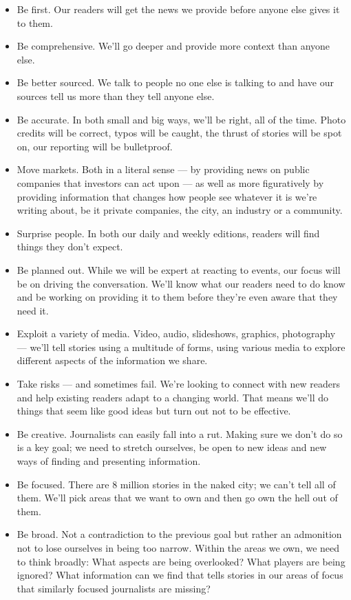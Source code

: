 \documentclass[
  11pt,
  american,
  letterpaperpaper,
  extrafontsizes,onecolumn,openright
  ]{memoir}
\providecommand{\tightlist}{%
  \setlength{\itemsep}{0pt}\setlength{\parskip}{0pt}}
\begin{document}
\begin{itemize}
\tightlist
\item
  Be first. Our readers will get the news we provide before anyone else gives it to them.
\item
  Be comprehensive. We'll go deeper and provide more context than anyone else.
\item
  Be better sourced. We talk to people no one else is talking to and have our sources tell us more than they tell anyone else.
\item
  Be accurate. In both small and big ways, we'll be right, all of the time. Photo credits will be correct, typos will be caught, the thrust of stories will be spot on, our reporting will be bulletproof.
\item
  Move markets. Both in a literal sense --- by providing news on public companies that investors can act upon --- as well as more figuratively by providing information that changes how people see whatever it is we're writing about, be it private companies, the city, an industry or a community.
\item
  Surprise people. In both our daily and weekly editions, readers will find things they don't expect.
\item
  Be planned out. While we will be expert at reacting to events, our focus will be on driving the conversation. We'll know what our readers need to do know and be working on providing it to them before they're even aware that they need it.
\item
  Exploit a variety of media. Video, audio, slideshows, graphics, photography --- we'll tell stories using a multitude of forms, using various media to explore different aspects of the information we share.
\item
  Take risks --- and sometimes fail. We're looking to connect with new readers and help existing readers adapt to a changing world. That means we'll do things that seem like good ideas but turn out not to be effective.
\item
  Be creative. Journalists can easily fall into a rut. Making sure we don't do so is a key goal; we need to stretch ourselves, be open to new ideas and new ways of finding and presenting information.
\item
  Be focused. There are 8 million stories in the naked city; we can't tell all of them. We'll pick areas that we want to own and then go own the hell out of them.
\item
  Be broad. Not a contradiction to the previous goal but rather an admonition not to lose ourselves in being too narrow. Within the areas we own, we need to think broadly: What aspects are being overlooked? What players are being ignored? What information can we find that tells stories in our areas of focus that similarly focused journalists are missing?

\end{itemize}
\end{document}
